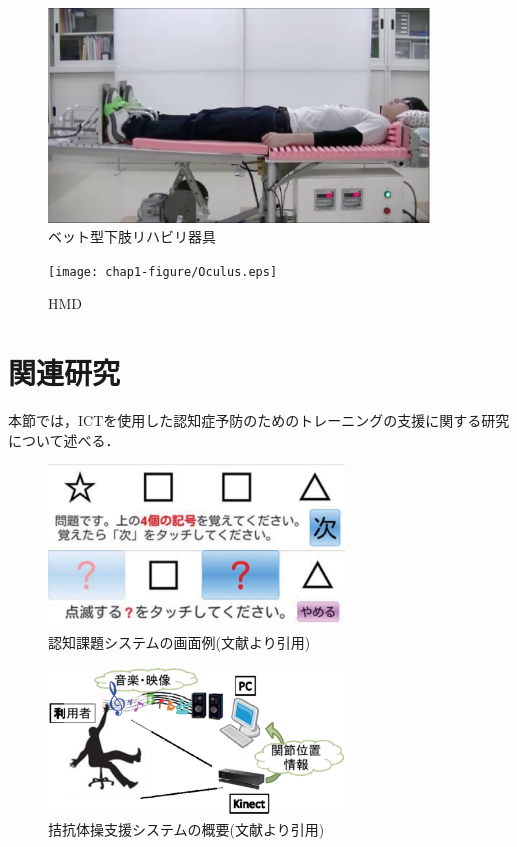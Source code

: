 \begin{figure}[tbp]
	\centering
			\includegraphics[width=0.9\textwidth]{chap1-figure/tadouhoku.eps}
	\caption{ベット型下肢リハビリ器具}
	\label{fig:tadouhokou}
\end{figure}

\begin{figure}[tbp]
	\centering
			\texttt{[image: chap1-figure/Oculus.eps]}
	\caption{HMD}
	\label{fig:Oculus}
\end{figure}
\fi

\section{関連研究}
本節では，ICTを使用した認知症予防のためのトレーニングの支援に関する研究について述べる．

\begin{figure}[tbp]
	\centering
			\includegraphics[width=0.7\textwidth]{chap1-figure/cognition_system.eps}
	\caption{認知課題システムの画面例(文献より引用)}
	\label{fig:cognition_system}
\end{figure}

\begin{figure}[tbp]
	\centering
			\includegraphics[width=0.7\textwidth]{chap1-figure/antagonism_system.eps}
	\caption{拮抗体操支援システムの概要(文献より引用)}
	\label{fig:antagonism_system}
\end{figure}

